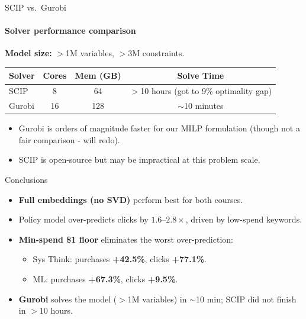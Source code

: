\documentclass[smaller]{beamer}
\begin{document}
\begin{frame}{SCIP vs.\ Gurobi}
\framesubtitle{Solver performance comparison}

\textbf{Model size:} $>$1M variables, $>$3M constraints.

\medskip
\begin{table}[htbp]
\centering
\begin{tabular}{lccc}
\toprule
Solver & Cores & Mem (GB) & Solve Time \\
\midrule
SCIP   & 8 & 64 & $>$10 hours (got to 9\% optimality gap) \\
Gurobi & 16 & 128 & $\sim$10 minutes \\
\bottomrule
\end{tabular}
\end{table}

\medskip
\begin{itemize}
    \item Gurobi is orders of magnitude faster for our MILP formulation (though not a fair comparison - will redo).
    \item SCIP is open-source but may be impractical at this problem scale.
\end{itemize}

\end{frame}

\begin{frame}{Conclusions}

\begin{itemize}
    \item \textbf{Full embeddings (no SVD)} perform best for both courses.
    \item Policy model over-predicts clicks by $1.6$--$2.8\times$, driven by low-spend keywords.
    \item \textbf{Min-spend \$1 floor} eliminates the worst over-prediction:
    \begin{itemize}
        \item Sys Think: purchases \textbf{+42.5\%}, clicks \textbf{+77.1\%}.
        \item ML: purchases \textbf{+67.3\%}, clicks \textbf{+9.5\%}.
    \end{itemize}
    \item \textbf{Gurobi} solves the model ($>$1M variables) in $\sim$10 min; SCIP did not finish in $>$10 hours.
\end{itemize}

\end{frame}
\end{document}
